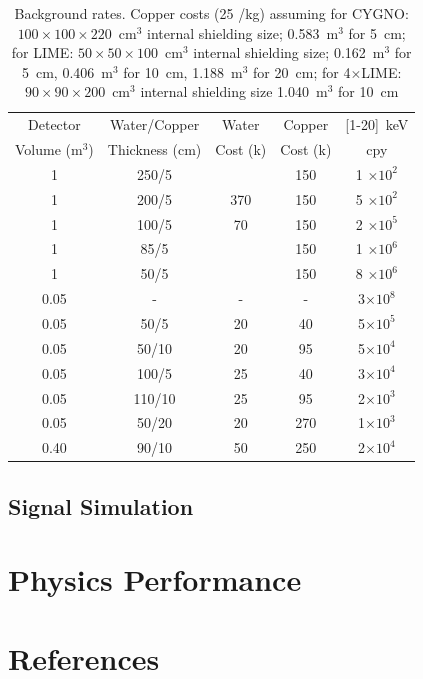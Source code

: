 \documentclass[physics,article,submit,moreauthors,pdftex]{Definitions/mdpi}
\begin{document}
\begin{table}[h!]
\centering
\caption{Background rates. Copper costs (25 \EUR{}/kg) assuming for CYGNO: $100\times100\times220$~cm$^3$ internal shielding size; 0.583~m$^3$ for 5~cm;
for LIME: 
$50\times50\times100$~cm$^3$ internal shielding size; 0.162~m$^3$ for 5~cm, 0.406~m$^3$ for 10~cm, 1.188~m$^3$ for 20~cm;
for 4$\times$LIME: $90\times90\times200$~cm$^3$ internal shielding size 1.040~m$^3$ for 10~cm}

\begin{tabular}{|c|c|c|c|c|} 
 \hline
Detector        & Water/Copper   & Water         &  Copper & [1-20]~keV \\
Volume (m$^3$)  & Thickness (cm) & Cost (k\EUR{})&  Cost (k\EUR{}) & cpy    \\
\hline
\hline
1 & 250/5 & & 150 & 1 $\times 10^{2}$ \\
\hline
1 & 200/5 & 370 & 150 & 5 $\times 10^{2}$ \\
\hline
1 & 100/5 & 70 & 150 & 2 $\times 10^{5}$ \\
\hline
1 & 85/5 & & 150 & 1 $\times 10^{6}$ \\
\hline
1 & 50/5 & & 150 & 8 $\times 10^{6}$ \\
\hline
\hline
0.05 & - & - & - & 3$\times 10^8$ \\
\hline
0.05 & 50/5 & 20 & 40 & 5$\times 10^5$ \\
\hline
0.05 & 50/10 & 20 & 95 & 5$\times 10^4$ \\
\hline
0.05 & 100/5 & 25 & 40 & 3$\times 10^4$ \\
\hline
0.05 & 110/10 & 25 & 95 & 2$\times 10^3$ \\
\hline
0.05 & 50/20 & 20 & 270 & 1$\times 10^3$ \\
\hline
0.40 & 90/10 & 50 & 250 & 2$\times 10^4$ \\
\hline
\hline
\end{tabular}
\label{tab:shield}
\end{table}

\subsection{Signal Simulation}

\section{Physics Performance}
\section*{References}


\end{document}
